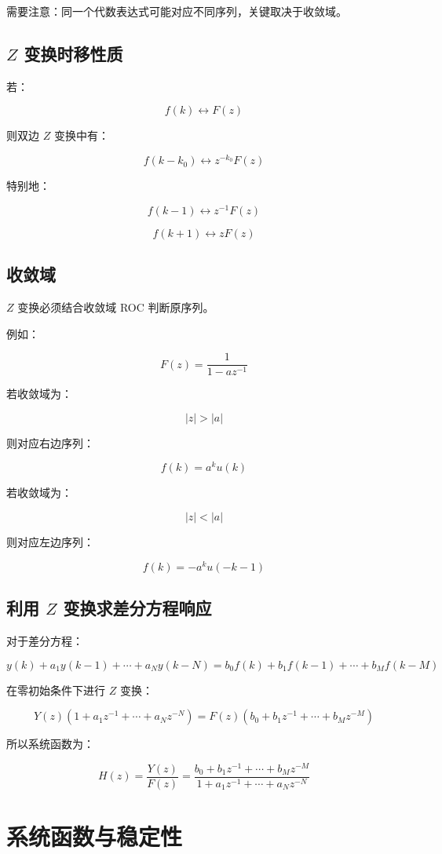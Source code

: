 \documentclass[UTF8]{ctexart}
\begin{document}
需要注意：同一个代数表达式可能对应不同序列，关键取决于收敛域。

\subsection{$Z$ 变换时移性质}

若：

\[
f(k)\leftrightarrow F(z)
\]

则双边 $Z$ 变换中有：

\[
f(k-k_0)\leftrightarrow z^{-k_0}F(z)
\]

特别地：

\[
f(k-1)\leftrightarrow z^{-1}F(z)
\]

\[
f(k+1)\leftrightarrow zF(z)
\]

\subsection{收敛域}

$Z$ 变换必须结合收敛域 ROC 判断原序列。

例如：

\[
F(z)=\frac{1}{1-az^{-1}}
\]

若收敛域为：

\[
|z|>|a|
\]

则对应右边序列：

\[
f(k)=a^ku(k)
\]

若收敛域为：

\[
|z|<|a|
\]

则对应左边序列：

\[
f(k)=-a^ku(-k-1)
\]

\subsection{利用 $Z$ 变换求差分方程响应}

对于差分方程：

\[
y(k)+a_1y(k-1)+\cdots+a_Ny(k-N)
=
b_0f(k)+b_1f(k-1)+\cdots+b_Mf(k-M)
\]

在零初始条件下进行 $Z$ 变换：

\[
Y(z)\left(1+a_1z^{-1}+\cdots+a_Nz^{-N}\right)
=
F(z)\left(b_0+b_1z^{-1}+\cdots+b_Mz^{-M}\right)
\]

所以系统函数为：

\[
H(z)=\frac{Y(z)}{F(z)}
=
\frac{b_0+b_1z^{-1}+\cdots+b_Mz^{-M}}
{1+a_1z^{-1}+\cdots+a_Nz^{-N}}
\]

\section{系统函数与稳定性}
\end{document}
